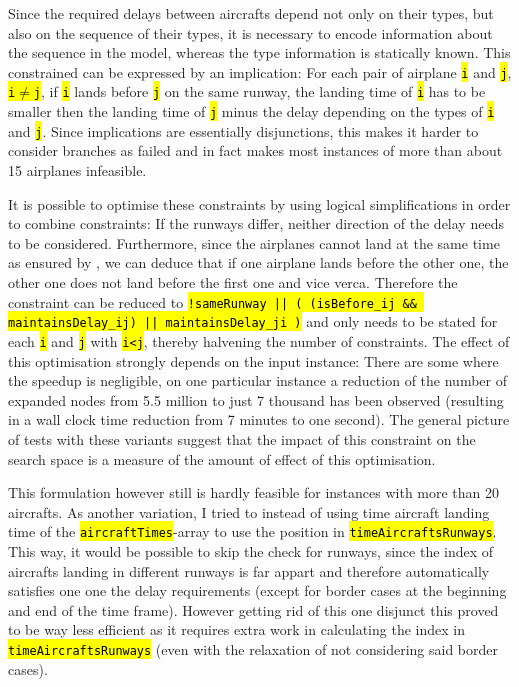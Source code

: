 \documentclass[,%
			paper=a4,%
			DIV12,
			liststotoc,
			bibtotoc,
			draft=false,%
			numbers=noendperiod
			]{scrartcl}
\newcommand{\ilc}[1]{\hl{\texttt{#1}}}
\newcommand{\mymarginnote}[1]{\marginnote{\footnotesize{#1}}}
\begin{document}
\mymarginnote{\CseqDel}
Since the required delays between aircrafts depend not only on their types, but also on the sequence of their types, it is necessary to encode information about the sequence in the model, whereas the type information is statically known.
This constrained can be expressed by an implication: For each pair of airplane \ilc{i} and \ilc{j}, \ilc{i$\neq$j}, if \ilc{i} lands before \ilc{j} on the same runway, the landing time of \ilc{i} has to be smaller then the landing time of \ilc{j} minus the delay depending on the types of \ilc{i} and \ilc{j}.
Since implications are essentially disjunctions, this makes it harder to consider branches as failed and in fact makes most instances of more than about 15 airplanes infeasible.

It is possible to optimise these constraints by using logical simplifications in order to combine constraints: If the runways differ, neither direction of the delay needs to be considered. Furthermore, since the airplanes cannot land at the same time as ensured by \Crunway, we can deduce that if one airplane lands before the other one, the other one does not land before the first one and vice verca. Therefore the constraint can be reduced to \ilc{!sameRunway || ( (isBefore\_ij \&\& maintainsDelay\_ij) || maintainsDelay\_ji )} and only needs to be stated for each \ilc{i} and \ilc{j} with \ilc{i<j}, thereby halvening the number of constraints.
The effect of this optimisation strongly depends on the input instance: There are some where the speedup is negligible, on one particular instance a reduction of the number of expanded nodes from 5.5 million to just 7 thousand has been observed (resulting in a wall clock time reduction from 7 minutes to one second).
The general picture of tests with these variants suggest that the impact of this constraint on the search space is a measure of the amount of effect of this optimisation.

This formulation however still is hardly feasible for instances with more than 20 aircrafts. As another variation, I tried to instead of using time aircraft landing time of the \ilc{aircraftTimes}-array to use the position in \ilc{timeAircraftsRunways}.
This way, it would be possible to skip the check for runways, since the index of aircrafts landing in different runways is far appart and therefore automatically satisfies one one the delay requirements (except for border cases at the beginning and end of the time frame).
However getting rid of this one disjunct this proved to be way less efficient as it requires extra work in calculating the index in \ilc{timeAircraftsRunways} (even with the relaxation of not considering said border cases).
\end{document}
